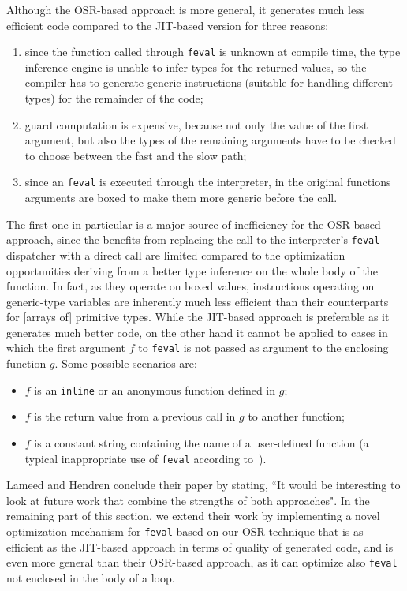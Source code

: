 Although the OSR-based approach is more general, it generates much less efficient code compared to the JIT-based version for three reasons:
\begin{enumerate}
\item since the function called through {\tt feval} is unknown at compile time, the type inference engine is unable to infer types for the returned values, so the compiler has to generate generic instructions (suitable for handling different types) for the remainder of the code;
\item guard computation is expensive, because not only the value of the first argument, but also the types of the remaining arguments have to be checked to choose between the fast and the slow path;
\item since an {\tt feval} is executed through the interpreter, in the original functions arguments are boxed to make them more generic before the call.
\end{enumerate}

The first one in particular is a major source of inefficiency for the OSR-based approach, since the benefits from replacing the call to the interpreter's {\tt feval} dispatcher with a direct call are limited compared to the optimization opportunities deriving from a better type inference on the whole body of the function. In fact, as they operate on boxed values, instructions operating on generic-type variables are inherently much less efficient than their counterparts for [arrays of] primitive types. While the JIT-based approach is preferable as it generates much better code, on the other hand it cannot be applied to cases in which the first argument $f$ to {\tt feval} is not passed as argument to the enclosing function $g$. Some possible scenarios are:
\begin{itemize}
\item $f$ is an {\tt inline} or an anonymous function defined in $g$;
\item $f$ is the return value from a previous call in $g$ to another function;
\item $f$ is a constant string containing the name of a user-defined function (a typical inappropriate use of {\tt feval} according to~\cite{radpour2013refactoring}).
\end{itemize}
 
Lameed and Hendren conclude their paper by stating, ``It would be interesting to look at future work that combine the
strengths of both approaches". In the remaining part of this section, we extend their work by implementing a novel optimization mechanism for {\tt feval} based on our OSR technique that is as efficient as the JIT-based approach in terms of quality of generated code, and is even more general than their OSR-based approach, as it can optimize also {\tt feval} not enclosed in the body of a loop.

